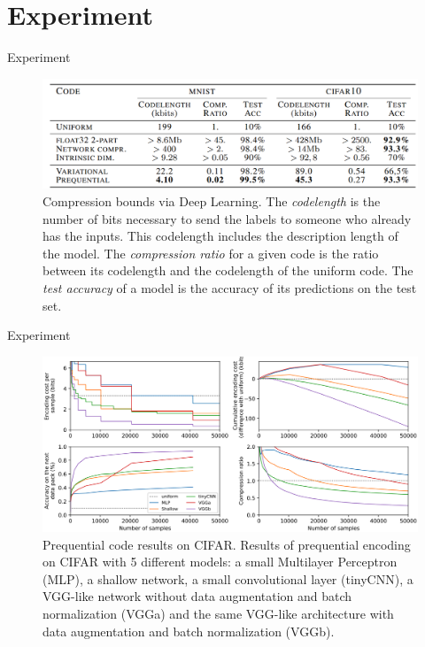 \documentclass[10pt, handout, envcountsect]{beamer} %
\begin{document}
\section{Experiment}
\begin{frame}{Experiment}


\begin{figure}[h]
    \centering
    \includegraphics[width=12cm,]{fig2.png}
    \caption{Compression bounds via Deep Learning. The \emph{codelength} is the number of bits necessary to send the labels to someone who already has the inputs. This codelength includes the description length of the model. The \emph{compression ratio} for a given code is the ratio between its codelength and the codelength of the uniform code. The \emph{test accuracy} of a model is the accuracy of its predictions on the test set.}
\end{figure} 
    
\end{frame}


\begin{frame}{Experiment}


\begin{figure}[h]
    \centering
    \includegraphics[width=12cm,]{fig3.png}
    \caption{Prequential code results on CIFAR. Results of prequential encoding on CIFAR with 5 different models: a small Multilayer Perceptron (MLP), a shallow network, a small convolutional layer (tinyCNN), a VGG-like network without data augmentation and batch normalization (VGGa) and the same VGG-like architecture with data augmentation and batch normalization (VGGb).}
\end{figure} 
    
\end{frame}

\end{document}
